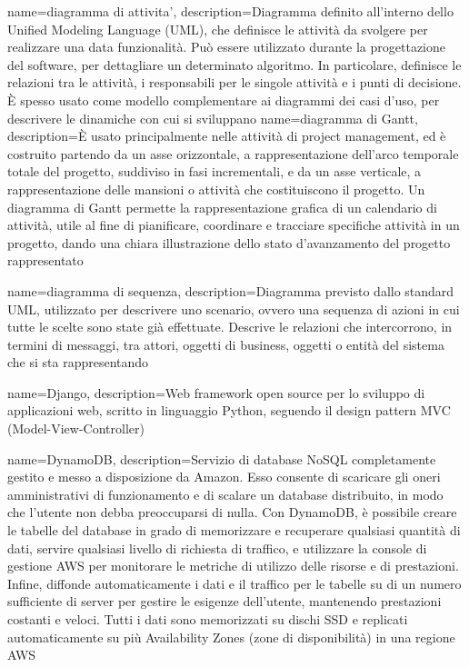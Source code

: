{
	name=diagramma di attivita',
	description={Diagramma definito all'interno dello Unified Modeling Language (UML), che definisce le attività da svolgere per realizzare una data funzionalità. Può essere utilizzato durante la progettazione del software, per dettagliare un determinato algoritmo. In particolare, definisce le relazioni tra le attività, i responsabili per le singole attività e i punti di decisione. \MakeUppercase{è} spesso usato come modello complementare ai diagrammi dei casi d'uso, per descrivere le dinamiche con cui si sviluppano}
}
{
	name=diagramma di Gantt,
	description={\MakeUppercase{è} usato principalmente nelle attività di project management, ed è costruito partendo da un asse orizzontale, a rappresentazione dell'arco temporale totale del progetto, suddiviso in fasi incrementali, e da un asse verticale, a rappresentazione delle mansioni o attività che costituiscono il progetto. Un diagramma di Gantt permette la rappresentazione grafica di un calendario di attività, utile al fine di pianificare, coordinare e tracciare specifiche attività in un progetto, dando una chiara illustrazione dello stato d'avanzamento del progetto rappresentato}
}

{
	name=diagramma di sequenza,
	description={Diagramma previsto dallo standard UML, utilizzato per descrivere uno scenario, ovvero una sequenza di azioni in cui tutte le scelte sono state già effettuate. Descrive le relazioni che intercorrono, in termini di messaggi, tra attori, oggetti di business, oggetti o entità del sistema che si sta rappresentando}
}

{
	name=Django,
	description={Web framework open source per lo sviluppo di applicazioni web, scritto in linguaggio Python, seguendo il design pattern MVC (Model-View-Controller)}
}

{
	name=DynamoDB,
	description={Servizio di database NoSQL completamente gestito e messo a disposizione da Amazon. Esso consente di scaricare gli oneri amministrativi di funzionamento e di scalare un database distribuito, in modo che l'utente non debba preoccuparsi di nulla.
	Con DynamoDB, è possibile creare le tabelle del database in grado di memorizzare e recuperare qualsiasi quantità di dati, servire qualsiasi livello di richiesta di traffico, e utilizzare la console di gestione AWS per monitorare le metriche di utilizzo delle risorse e di prestazioni. Infine, diffonde automaticamente i dati e il traffico per le tabelle su di un numero sufficiente di server per gestire le esigenze dell'utente, mantenendo prestazioni costanti e veloci. Tutti i dati sono memorizzati su dischi SSD e replicati automaticamente su più Availability Zones (zone di disponibilità) in una regione AWS}
}
